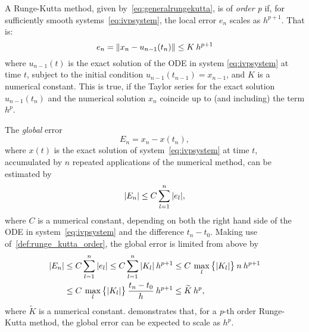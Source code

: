 \begin{defn}
    \label{def:runge_kutta_order}
    A Runge-Kutta method, given by~\cref{eq:generalrungekutta}, is of
    \emph{order p} if, for sufficiently smooth systems~\eqref{eq:ivpsystem},
    the local error $e_{n}$ scales as $h^{p+1}$. That is:
    \begin{equation}
        \label{eq:rungekuttaorder}
        e_{n} = \norm{x_{n}-u_{n-1}(t_{n})} \leq K\hspace{0.5ex}h^{p+1}
    \end{equation}
    where $u_{n-1}(t)$ is the exact solution of the ODE in system
    \eqref{eq:ivpsystem} at time $t$, subject to the initial condition
    $u_{n-1}(t_{n-1}) = x_{n-1}$, and $K$ is a numerical constant. This is true,
    if the Taylor series for the exact solution $u_{n-1}(t_{n})$ and the
    numerical solution $x_{n}$ coincide up to (and including) the term $h^{p}$.
\end{defn}%
The \emph{global} error
\begin{equation}
    \label{eq:globalrungekuttaerror}
    E_{n} = x_{n}-x(t_{n}),
\end{equation}
where $x(t)$ is the exact solution of system~\eqref{eq:ivpsystem} at time $t$,
accumulated by $n$ repeated applications of the numerical method, can be
estimated by
\begin{equation}
    \label{eq:globalrungekuttaerrorapprox}
    \abs{E_{n}} \leq C\sum\limits_{l=1}^{n}\abs{e_{l}},
\end{equation}
where $C$ is a numerical constant, depending on both the right hand side of the
ODE in system~\eqref{eq:ivpsystem} and the difference $t_{n}-t_{0}$. Making
use of~\cref{def:runge_kutta_order}, the global error is limited from above by
\begin{equation}
    \label{eq:globalrungekuttaerrorestimate}
    \begin{aligned}
        \abs{E_{n}} &\leq C\sum\limits_{l=1}^{n}\abs{e_{l}} %
        \leq C\sum\limits_{l=1}^{n}\abs{K_{l}}\hspace{0.5ex}h^{p+1}%
        \leq C\hspace{0.5ex}\max\limits_{l}\big\{\abs{K_{l}}\big\}%
        \hspace{0.5ex}n\hspace{0.5ex}h^{p+1}\\
        &\leq C\hspace{0.5ex}\max\limits_{l}\big\{\abs{K_{l}}\big\}%
        \hspace{0.5ex}\frac{t_{n}-t_{0}}{h}\hspace{0.5ex}h^{p+1}
        \leq \widetilde{K}\hspace{0.5ex}h^{p},
    \end{aligned}
\end{equation}
where $\widetilde{K}$ is a numerical constant.
 demonstrates that, for a \emph{p}-th
order Runge-Kutta method, the global error can be expected to scale as $h^{p}$.

